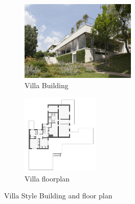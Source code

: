                         \begin{figure}[h]
                                \centering
                                \begin{subfigure}{.4\textwidth}
                                        \centering
                                        \includegraphics[height=1.5in]{img/chapter_6/Villa.jpg}
                                        \caption{Villa Building}
                                        \label{fig:Villa Building}
                                \end{subfigure}
                                \begin{subfigure}{.5\textwidth}
                                        \centering
                                        \includegraphics[height=1.5in]{img/chapter_6/Villa-floorplan.jpg}
                                        \caption{Villa floorplan}
                                        \label{fig:Villa floorplan}
                                \end{subfigure}
                                \caption{Villa Style Building and floor plan}
                                \label{fig:Villa Style Building and floor plan}
                        \end{figure}

